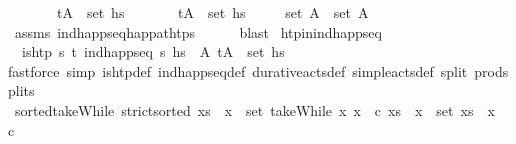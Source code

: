 \begin{isabellebody}
\ \ \ \ \ \ \ {\isachardoublequoteopen}{\isacharparenleft}{\kern0pt}t{\isacharcomma}{\kern0pt}A{\isacharparenright}{\kern0pt}\ {\isasymin}\ set\ hs{\isachardoublequoteclose}\isanewline
\ \ \ \ \ \ \ {\isachardoublequoteopen}{\isacharparenleft}{\kern0pt}t{\isacharcomma}{\kern0pt}A{\isacharprime}{\kern0pt}{\isacharparenright}{\kern0pt}\ {\isasymin}\ set\ hs{\isacharprime}{\kern0pt}{\isachardoublequoteclose}\isanewline
\ \ \ \ \ {\isachardoublequoteopen}set\ A\ {\isacharequal}{\kern0pt}\ set\ A{\isacharprime}{\kern0pt}{\isachardoublequoteclose}\isanewline
%
\isadelimproof
\ \ \ \ %
\endisadelimproof
%
\isatagproof
{}\isamarkupfalse%
\ assms\ ind{\isacharunderscore}{\kern0pt}happ{\isacharunderscore}{\kern0pt}seq{\isacharunderscore}{\kern0pt}happ{\isacharunderscore}{\kern0pt}at{\isacharunderscore}{\kern0pt}htps\isanewline
\ \ \ \ \isamarkupfalse%
\ blast%
\endisatagproof
{\isafoldproof}%
%
\isadelimproof
\isanewline
%
\endisadelimproof
\isanewline
{}\isamarkupfalse%
\ htp{\isacharunderscore}{\kern0pt}in{\isacharunderscore}{\kern0pt}ind{\isacharunderscore}{\kern0pt}happ{\isacharunderscore}{\kern0pt}seq{\isacharcolon}{\kern0pt}\isanewline
\ \ {\isachardoublequoteopen}{\isasymlbrakk}is{\isacharunderscore}{\kern0pt}htp\ {\isasympi}s\ t{\isacharsemicolon}{\kern0pt}\ ind{\isacharunderscore}{\kern0pt}happ{\isacharunderscore}{\kern0pt}seq\ {\isasympi}s\ hs{\isasymrbrakk}\ {\isasymLongrightarrow}\ {\isasymexists}A{\isachardot}{\kern0pt}\ {\isacharparenleft}{\kern0pt}t{\isacharcomma}{\kern0pt}A{\isacharparenright}{\kern0pt}\ {\isasymin}\ set\ hs{\isachardoublequoteclose}\isanewline
%
\isadelimproof
\ \ %
\endisadelimproof
%
\isatagproof
{}\isamarkupfalse%
{\isacharparenleft}{\kern0pt}fastforce\ simp{\isacharcolon}{\kern0pt}\ is{\isacharunderscore}{\kern0pt}htp{\isacharunderscore}{\kern0pt}def\ ind{\isacharunderscore}{\kern0pt}happ{\isacharunderscore}{\kern0pt}seq{\isacharunderscore}{\kern0pt}def\ durative{\isacharunderscore}{\kern0pt}acts{\isacharunderscore}{\kern0pt}def\ simple{\isacharunderscore}{\kern0pt}acts{\isacharunderscore}{\kern0pt}def\ split{\isacharcolon}{\kern0pt}\ prod{\isachardot}{\kern0pt}splits{\isacharparenright}{\kern0pt}%
\endisatagproof
{\isafoldproof}%
%
\isadelimproof
\isanewline
%
\endisadelimproof
\isanewline
{}\isamarkupfalse%
\ sorted{\isacharunderscore}{\kern0pt}takeWhile{\isacharcolon}{\kern0pt}\ {\isachardoublequoteopen}strict{\isacharunderscore}{\kern0pt}sorted\ xs\ {\isasymLongrightarrow}\ x\ {\isasymin}\ set\ {\isacharparenleft}{\kern0pt}takeWhile\ {\isacharparenleft}{\kern0pt}{\isacharparenleft}{\kern0pt}{\isasymlambda}x{\isachardot}{\kern0pt}\ x\ {\isacharless}{\kern0pt}\ c{\isacharparenright}{\kern0pt}{\isacharparenright}{\kern0pt}\ xs{\isacharparenright}{\kern0pt}\ {\isacharequal}{\kern0pt}\ {\isacharparenleft}{\kern0pt}x\ {\isasymin}\ set\ xs\ {\isasymand}\ {\isacharparenleft}{\kern0pt}x\ {\isacharless}{\kern0pt}\ c{\isacharparenright}{\kern0pt}{\isacharparenright}{\kern0pt}{\isachardoublequoteclose}\isanewline

\end{isabellebody}
